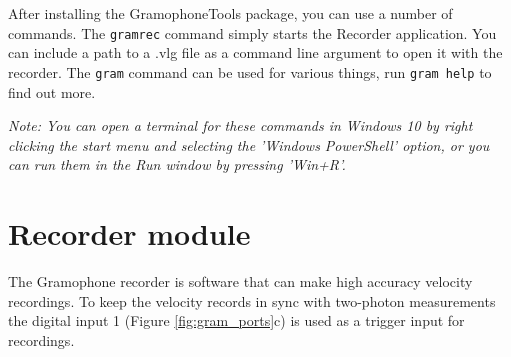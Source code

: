 \documentclass[11pt,a4paper]{article}
\newcommand{\note}[1]{\textit{Note: {#1}}}
\begin{document}
After installing the GramophoneTools package, you can use a number of commands. The \texttt{gramrec} command simply starts the Recorder application. You can include a path to a .vlg file as a command line argument to open it with the recorder. The \texttt{gram} command can be used for various things, run \texttt{gram help} to find out more.

\note{You can open a terminal for these commands in Windows 10 by right clicking the start menu and selecting the 'Windows PowerShell' option, or you can run them in the Run window by pressing 'Win+R'.}

\section{Recorder module} 
The Gramophone recorder is software that can make high accuracy velocity recordings. To keep the velocity records in sync with two-photon measurements the digital input 1 (Figure \ref{fig:gram_ports}c) is used as a trigger input for recordings. 
\end{document}
